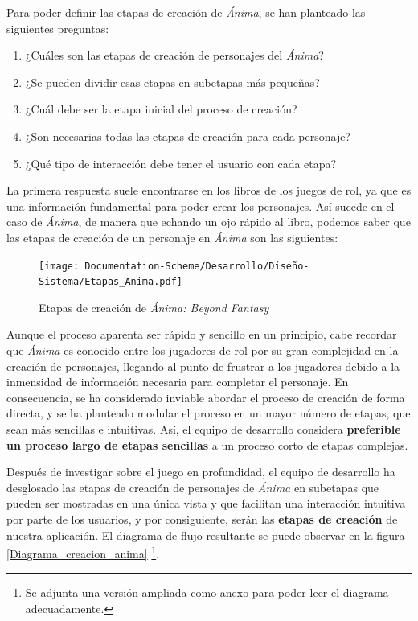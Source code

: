 Para poder definir las etapas de creación de \textit{Ánima}, se han planteado las siguientes preguntas:

\begin{enumerate}
    \item ¿Cuáles son las etapas de creación de personajes del \textit{Ánima}?
    \item ¿Se pueden dividir esas etapas en subetapas más pequeñas?
    \item ¿Cuál debe ser la etapa inicial del proceso de creación?
    \item ¿Son necesarias todas las etapas de creación para cada personaje?
    \item ¿Qué tipo de interacción debe tener el usuario con cada etapa?
\end{enumerate}

La primera respuesta suele encontrarse en los libros de los juegos de rol, ya que es una información 
fundamental para poder crear los personajes. Así sucede en el caso de \textit{Ánima}, de manera que 
echando un ojo rápido al libro, podemos saber que las etapas de creación de un personaje en \textit{Ánima}
son las siguientes: \medskip

\begin{figure}[H]
    \centering
    \texttt{[image: Documentation-Scheme/Desarrollo/Diseño-Sistema/Etapas\_Anima.pdf]}
    \caption{Etapas de creación de \textit{Ánima: Beyond Fantasy}}
    \label{Etapas_anima}
\end{figure}

Aunque el proceso aparenta ser rápido y sencillo en un principio, cabe recordar que \textit{Ánima} es conocido 
entre los jugadores de rol por su gran complejidad en la creación de personajes, llegando al punto de frustrar a 
los jugadores debido a la inmensidad de información necesaria para completar el personaje. En consecuencia, se 
ha considerado inviable abordar el proceso de creación de forma directa, y se ha planteado modular el proceso en 
un mayor número de etapas, que sean más sencillas e intuitivas. Así, el equipo de desarrollo considera 
\textbf{preferible un proceso largo de etapas sencillas} a un proceso corto de etapas complejas. \medskip

Después de investigar sobre el juego en profundidad, el equipo de desarrollo ha desglosado las etapas de 
creación de personajes de \textit{Ánima} en subetapas que pueden ser mostradas en una única vista y que 
facilitan una interacción intuitiva por parte de los usuarios, y por consiguiente, 
serán las \textbf{etapas de creación} de nuestra aplicación. El diagrama de flujo resultante se puede 
observar en la figura \ref*{Diagrama_creacion_anima} \footnote[1]{Se adjunta una versión ampliada como anexo 
para poder leer el diagrama adecuadamente.}.\medskip

